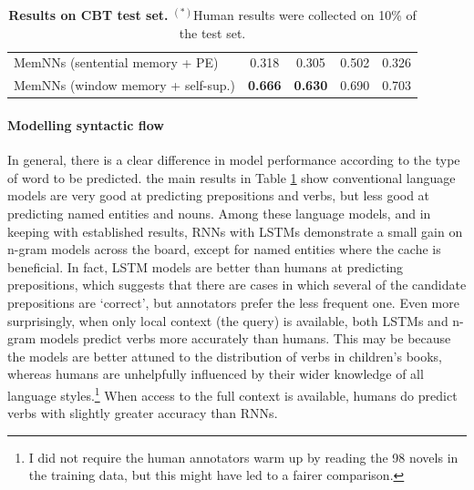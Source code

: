 \begin{table}[t]
\begin{center}
{{\begin{tabular}{l|cccc}
          MemNNs  (sentential memory + PE) & 0.318 & 0.305 & 0.502 & 0.326 \\
          MemNNs  (window memory + self-sup.) & \bf 0.666 & \bf 0.630 & 0.690 & 0.703\\
          \hline 
        \end{tabular}
      }
    }
    \caption{\label{tab:cbt_res} {\bf Results on CBT test set.} $^{(*)}$Human results were
      collected on 10\% of the test set.}\label{tab:cbt_res}
  \end{center}
  \vspace*{-4ex}
\end{table}



\paragraph{Modelling syntactic flow} 
In general, there is a clear difference in model performance according
to the type of word to be predicted. the main results in Table \ref{tab:cbt_res}
show  conventional language models are very good at
predicting prepositions and verbs, but less good at predicting named
entities and nouns. Among these language models, and in keeping with
established results, RNNs with LSTMs demonstrate a small gain on
n-gram models across the board, except for named entities where the cache is beneficial. 
In fact, LSTM models are better than humans at predicting prepositions, which suggests that there are cases in which several of the candidate prepositions are `correct', but annotators prefer the less frequent one.  Even more surprisingly, when only local context (the query) is available, both LSTMs and n-gram models predict verbs more accurately than humans. This may be because the models are better attuned to the distribution of verbs in children's books, whereas humans are unhelpfully influenced by their wider knowledge of all language styles.\footnote{I did not require the human annotators warm up by reading the 98 novels in the training data, but this might have led to a fairer comparison.} When access to the full context is available, humans do predict verbs with slightly greater accuracy than RNNs. 

